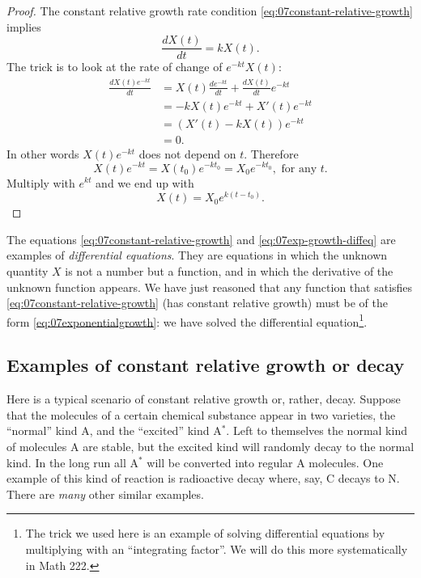 \begin{proof}
  The constant relative growth rate condition
  \eqref{eq:07constant-relative-growth} implies
  \begin{equation}\label{eq:07exp-growth-diffeq}
    \frac{dX(t)}{dt} = kX(t).
  \end{equation}
  The trick is to look at the rate of change of $e^{-kt}X(t)$:
  \begin{align*}
    \frac{dX(t)e^{-kt}}{dt}
    &=X(t)\frac{de^{-kt}}{dt} + \frac{dX(t)}{dt}e^{-kt}\\
    &=-kX(t) e^{-kt}+X'(t)e^{-kt}\\
    &= (X'(t) - kX(t))e^{-kt} \\
    &=0.
  \end{align*}
  In other words $X(t)e^{-kt}$ does not depend on $t$.  Therefore
  \[
  X(t)e^{-kt} = X(t_0) e^{-kt_0} = X_0 e^{-kt_0}, \text{ for any $t$.}
  \]
  Multiply with $e^{kt}$ and we end up with
  \[
  X(t) = X_0e^{k(t-t_0)}.
  \]
\end{proof}
The equations \eqref{eq:07constant-relative-growth} and
\eqref{eq:07exp-growth-diffeq} are examples of \textit{differential
  equations}.  They are equations in which the unknown quantity $X$ is
not a number but a function, and in which the derivative of the
unknown function appears.  We have just reasoned that any function
that satisfies \eqref{eq:07constant-relative-growth} (has constant
relative growth) must be of the form \eqref{eq:07exponentialgrowth}:
we have solved the differential equation\footnote{The trick we used here is an
example of solving differential equations by multiplying with an ``integrating
factor''.  We will do this more systematically in Math 222.}.




\subsection{Examples of constant relative growth or decay} %
\label{sec:07examples-of-const-relative-growth}
Here is a typical scenario of constant relative growth or, rather,
decay.  Suppose that the molecules of a certain chemical substance
appear in two varieties, the ``normal'' kind A, and the ``excited''
kind A$^*$.  Left to themselves the normal kind of molecules A are
stable, but the excited kind will randomly decay to the normal kind.
In the long run all A$^*$ will be converted into regular A molecules.
One example of this kind of reaction is radioactive decay where, say,
\raisebox{-3pt}{\footnotesize14}C decays to
\raisebox{-3pt}{\footnotesize14}N.  There are \textit{many} other
similar examples.




